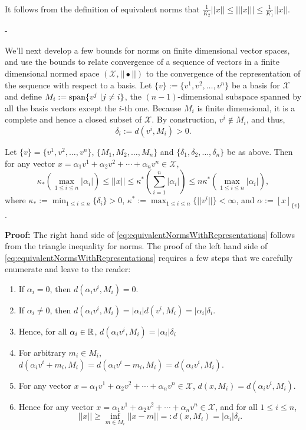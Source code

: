 \begin{rem}
It follows from the definition of equivalent norms that
$ \frac{1}{K_2}||x|| \le |||x||| \le \frac{1}{K_1} ||x||. $  
\end{rem}
-

We'll next develop a few bounds for norms on finite dimensional vector spaces, and use the bounds to relate convergence of a sequence of vectors in a finite dimensional normed space $(\mathcal{X}, ||\bullet ||)$ to the convergence of the representation of the sequence with respect to a basis. Let $\{v\}:=\{v^1, v^2, \ldots, v^n \}$ be a basis for $\mathcal{X}$ and define $M_i :=\mathrm{span} \{ v^j~| j \neq i \}$, the $(n-1)$-dimensional subspace spanned by all the basis vectors except the $i$-th one. Because $M_i$ is finite dimensional, it is a complete and hence a closed subset of $\mathcal{X}$. By construction, $v^i \not \in M_i$, and thus, 
$$\delta_i:= d(v^i, M_i)>0. $$

\begin{lem} Let $\{v\}=\{v^1, v^2, \ldots, v^n \}$, $\{M_1, M_2, \ldots, M_n\}$ and $\{\delta_1, \delta_2, \ldots, \delta_n\}$ be as above. Then for any vector $x = \alpha_1 v^1+ \alpha_2 v^2 + \cdots + \alpha_n v^n \in \mathcal{X}$, 
\begin{equation}
\label{eq:equivalentNormsWithRepresentations}
    \kappa_\ast \left( \max_{1 \le i \le n} |\alpha_i| \right)  \le  ||x|| \le \kappa^\ast \left( \sum_{i=1}^n |\alpha_i| \right) \le n \kappa^\ast  \left( \max_{1 \le i \le n} |\alpha_i| \right),
\end{equation} 
where $\kappa_\ast:=\min_{1 \le i \le n}\{ \delta_i\}>0$, $\kappa^\ast := \max_{1 \le i \le n}\{ ||v^i||\} < \infty$, and $\alpha:=[x]_{\{v\}}$.

\end{lem}

\textbf{Proof:} The right hand side of \eqref{eq:equivalentNormsWithRepresentations} follows from the triangle inequality for norms. The proof of the left hand side of \eqref{eq:equivalentNormsWithRepresentations} requires a few steps that we carefully enumerate and leave to the reader:
\begin{enumerate}
    \item If $\alpha_i=0$, then $d(\alpha_i v^i, M_i) =0$. 
    \item If  $\alpha_i\neq 0$, then $d(\alpha_i v^i, M_i) = |\alpha_i|d(v^i, M_i) = |\alpha_i| \delta_i$.
    \item Hence, for all $\alpha_i \in \mathbb R$, $d(\alpha_i v^i, M_i) = |\alpha_i| \delta_i$
    \item For arbitrary $m_i \in M_i$, $d(\alpha_i v^i+m_i, M_i)=d(\alpha_i v^i-m_i, M_i)=d(\alpha_i v^i, M_i).$
    \item For any vector $x = \alpha_1 v^1+ \alpha_2 v^2 + \cdots + \alpha_n v^n \in \mathcal{X}$, $d(x, M_i) = d(\alpha_i v^i, M_i)$.
    \item Hence for any vector $x = \alpha_1 v^1+ \alpha_2 v^2 + \cdots + \alpha_n v^n \in \mathcal{X}$, and for all $1 \le i \le n$,
    $$||x|| \ge \inf_{m \in M_i} || x - m|| =: d(x, M_i) = |\alpha_i| \delta_i.$$
\end{enumerate}
\Qed

